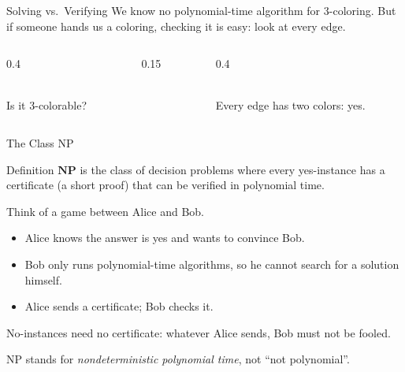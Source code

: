 \documentclass[10pt,aspectratio=169]{beamer}
\newcommand{\sevengraph}[7]{%
  \node[#1] (v1) at (0,0)        {1};
  \node[#2] (v2) at (0,1.6)      {2};
  \node[#3] (v3) at (1.39,0.8)   {3};
  \node[#4] (v4) at (1.39,-0.8)  {4};
  \node[#5] (v5) at (0,-1.6)     {5};
  \node[#6] (v6) at (-1.39,-0.8) {6};
  \node[#7] (v7) at (-1.39,0.8)  {7};
  \draw[edg] (v2)--(v3)--(v4)--(v5)--(v6)--(v7)--(v2);
  \draw[edg] (v1)--(v2); \draw[edg] (v1)--(v4); \draw[edg] (v1)--(v6);
  \draw[edg] (v3) to[bend right=20] (v6); \draw[edg] (v4) to[bend left=20] (v7);
}
\begin{document}
\begin{frame}{Solving vs.\ Verifying}
  We know no polynomial-time algorithm for 3-coloring. But if someone hands
  us a coloring, \alert{checking} it is easy: look at every edge.

  \begin{columns}[c]
    \begin{column}{0.4\textwidth}
      \begin{center}
      \\[2pt]
      \small Is it 3-colorable?
      \end{center}
    \end{column}
    \begin{column}{0.15\textwidth}
      \begin{center}
      \end{center}
    \end{column}
    \begin{column}{0.4\textwidth}
      \begin{center}
      \\[2pt]
      \small Every edge has two colors: yes.
      \end{center}
    \end{column}
  \end{columns}
\end{frame}

\begin{frame}{The Class NP}
  \begin{block}{Definition}
    $\mathbf{NP}$ is the class of decision problems where every
    yes-instance has a \alert{certificate} (a short proof) that can be
    \alert{verified} in polynomial time.
  \end{block}

  \bigskip
  Think of a game between Alice and Bob.
  \begin{itemize}
    \item Alice knows the answer is yes and wants to convince Bob.
    \item Bob only runs polynomial-time algorithms, so he cannot search for
          a solution himself.
    \item Alice sends a certificate; Bob checks it.
  \end{itemize}

  \medskip
  No-instances need no certificate: whatever Alice sends, Bob must not be
  fooled.

  \pause
  \medskip
  \small NP stands for \emph{nondeterministic polynomial time}, not ``not
  polynomial''.
\end{frame}
\end{document}
